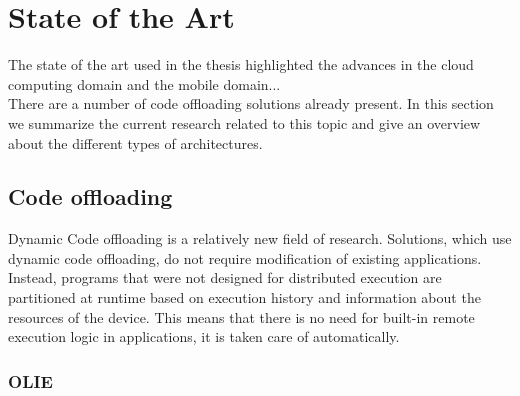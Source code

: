 
\chapter{State of the Art} %


The state of the art used in the thesis highlighted the advances in the cloud computing domain and the mobile domain...\\
There are a number of code offloading solutions already present. In this section we summarize the current research related to this topic and give an overview about the different types of architectures.


\ifpdf
    \graphicspath{{X/figures/PNG/}{X/figures/PDF/}{X/figures/}}
\else
    \graphicspath{{X/figures/EPS/}{X/figures/}}
\fi



\section{Code offloading}

Dynamic Code offloading is a relatively new field of research. Solutions, which use dynamic code offloading, do not require modification of existing applications. Instead, programs that were not designed for distributed execution are partitioned at runtime based on execution history and information about the resources of the device. This means that there is no need for built-in remote execution logic in applications, it is taken care of automatically.

\subsection{OLIE}

